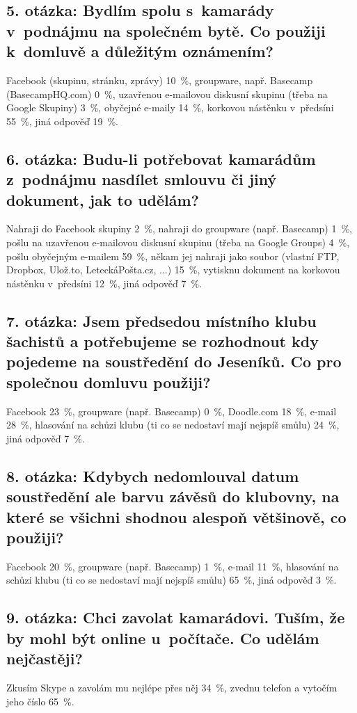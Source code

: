 \documentclass[12pt,oneside,final]{fithesis2}
\begin{document}
\subsection*{5. otázka: Bydlím spolu s~kamarády v~podnájmu na společném bytě. Co použiji k~domluvě a důležitým oznámením?}
Facebook (skupinu, stránku, zprávy) 10~\%,
groupware, např. Basecamp (BasecampHQ.com) 0~\%,
uzavřenou e-mailovou diskusní skupinu (třeba na Google Skupiny) 3~\%,
obyčejné e-maily 14~\%,
korkovou nástěnku v~předsíni 55~\%,
jiná odpověď 19~\%.

\subsection*{6. otázka: Budu-li potřebovat kamarádům z~podnájmu nasdílet smlouvu či jiný dokument, jak to udělám?}
Nahraji do Facebook skupiny 2~\%,
nahraji do groupware (např. Basecamp) 1~\%,
pošlu na uzavřenou e-mailovou diskusní skupinu (třeba na Google Groups) 4~\%,
pošlu obyčejným e-mailem 59~\%,
někam jej nahraji jako soubor (vlastní FTP, Dropbox, Ulož.to, LeteckáPošta.cz, ...) 15~\%,
vytisknu dokument na korkovou nástěnku v~předsíni 12~\%,
jiná odpověď 7~\%.

\subsection*{7. otázka: Jsem předsedou místního klubu šachistů a potřebujeme se rozhodnout kdy pojedeme na soustředění do Jeseníků. Co pro společnou domluvu použiji?}
Facebook 23~\%,
groupware (např. Basecamp) 0~\%,
Doodle.com 18~\%,
e-mail 28~\%,
hlasování na schůzi klubu (ti co se nedostaví mají nejspíš smůlu) 24~\%,
jiná odpověď 7~\%.

\subsection*{8. otázka: Kdybych nedomlouval datum soustředění ale barvu závěsů do klubovny, na které se všichni shodnou alespoň většinově, co použiji?}
Facebook 20~\%,
groupware (např. Basecamp) 1~\%,
e-mail 11~\%,
hlasování na schůzi klubu (ti co se nedostaví mají nejspíš smůlu) 65~\%,
jiná odpověď 3~\%.

\subsection*{9. otázka: Chci zavolat kamarádovi. Tuším, že by mohl být online u~počítače. Co udělám nejčastěji?}
Zkusím Skype a zavolám mu nejlépe přes něj 34~\%,
zvednu telefon a vytočím jeho číslo 65~\%.
\end{document}
